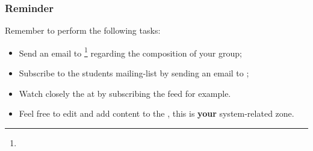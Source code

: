 
\begin{frame}
  \frametitle{Reminder}

  Remember to perform the following tasks:

  \begin{itemize}
    \item
      Send an email to
      \footnote{}
      regarding the composition of your group;
    \item
      Subscribe to the students mailing-list
       by sending an email to
      ;
    \item
      Watch closely the  at  by
      subscribing the  feed for example.
    \item
      Feel free to edit and add content to the , this is
      \textbf{your} system-related zone.
  \end{itemize}
\end{frame}


